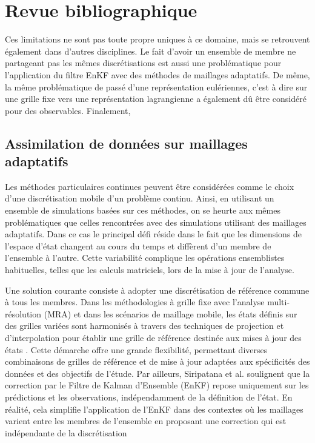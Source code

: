 \section{Revue bibliographique}

Ces limitations ne sont pas toute propre uniques à ce domaine, mais se retrouvent également dans d'autres disciplines. Le fait d'avoir un ensemble de membre ne partageant pas les mêmes discrétisations est aussi une problématique pour l'application du filtre EnKF avec des méthodes de maillages adaptatifs. De même, la même problématique de passé d'une représentation eulériennes, c'est à dire sur une grille fixe vers une représentation lagrangienne a également dû être considéré pour des observables. Finalement,

\subsection{Assimilation de données sur maillages adaptatifs}

Les méthodes particulaires continues peuvent être considérées comme le choix d'une discrétisation mobile d'un problème continu. Ainsi, en utilisant un ensemble de simulations basées sur ces méthodes, on se heurte aux mêmes problématiques que celles rencontrées avec des simulations utilisant des maillages adaptatifs.
Dans ce cas le principal défi réside dans le fait que les dimensions de l'espace d'état changent au cours du temps et diffèrent d'un membre de l'ensemble à l'autre. Cette variabilité complique les opérations ensemblistes habituelles, telles que les calculs matriciels, lors de la mise à jour de l'analyse.

Une solution courante consiste à adopter une discrétisation de référence commune à tous les membres. Dans les méthodologies à grille fixe avec l'analyse multi-résolution (MRA) et dans les scénarios de maillage mobile, les états définis sur des grilles variées sont harmonisés à travers des techniques de projection et d'interpolation pour établir une grille de référence destinée aux mises à jour des états \cite{siripatana_combining_2019, bonan_data_2017}. Cette démarche offre une grande flexibilité, permettant diverses combinaisons de grilles de référence et de mise à jour adaptées aux spécificités des données et des objectifs de l'étude. Par ailleurs, Siripatana et al. \cite{siripatana_combining_2019} soulignent que la correction par le Filtre de Kalman d’Ensemble (EnKF) repose uniquement sur les prédictions et les observations, indépendamment de la définition de l'état. En réalité, cela simplifie l'application de l'EnKF dans des contextes où les maillages varient entre les membres de l'ensemble en proposant une correction qui est indépendante de la discrétisation

